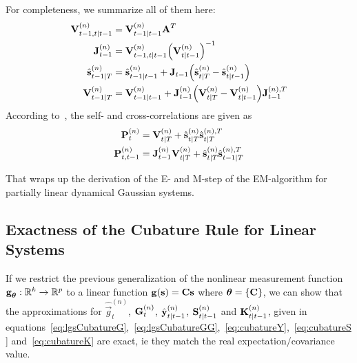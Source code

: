 		For completeness, we summarize all of them here:
		\begin{align}
			\boldsymbol{\mathrm{V}}_{t - 1, t \vert t - 1}^{(n)} &= \boldsymbol{\mathrm{V}}_{t - 1 \vert t - 1}^{(n)} \boldsymbol{\mathrm{A}}^T  \nonumber \\
			\boldsymbol{\mathrm{J}}_{t - 1}^{(n)} &= \boldsymbol{\mathrm{V}}_{t - 1, t \vert t - 1}^{(n)} \Big(\boldsymbol{\mathrm{V}}_{t \vert t - 1}^{(n)}\Big)^{-1}  \nonumber \\
			\hat{\boldsymbol{\mathrm{s}}}_{t - 1 \vert T}^{(n)} &= \hat{\boldsymbol{\mathrm{s}}}_{t - 1 \vert t - 1}^{(n)} + \boldsymbol{\mathrm{J}}_{t - 1} \Big(\hat{\boldsymbol{\mathrm{s}}}_{t \vert T}^{(n)} - \hat{\boldsymbol{\mathrm{s}}}_{t \vert t - 1}^{(n)}\Big)  \label{eq:posteriorMean} \\
			\boldsymbol{\mathrm{V}}_{t - 1 \vert T}^{(n)} &= \boldsymbol{\mathrm{V}}_{t - 1 \vert t - 1}^{(n)} + \boldsymbol{\mathrm{J}}_{t - 1}^{(n)} \Big(\boldsymbol{\mathrm{V}}_{t \vert T}^{(n)} - \boldsymbol{\mathrm{V}}_{t \vert t - 1}^{(n)}\Big) \boldsymbol{\mathrm{J}}_{t - 1}^{(n), T}  \label{eq:posteriorCov}
		\end{align}
		According to~\cite{minkaBayesianLinearRegression1999}, the self- and cross-correlations are given as
		\begin{align*}
			\boldsymbol{\mathrm{P}}_t^{(n)} &= \boldsymbol{\mathrm{V}}_{t \vert T}^{(n)} + \hat{\boldsymbol{\mathrm{s}}}_{t \vert T}^{(n)} \hat{\boldsymbol{\mathrm{s}}}_{t \vert T}^{(n), T} \\
			\boldsymbol{\mathrm{P}}_{t, t - 1}^{(n)} &= \boldsymbol{\mathrm{J}}_{t - 1}^{(n)} \boldsymbol{\mathrm{V}}_{t \vert T}^{(n)} + \hat{\boldsymbol{\mathrm{s}}}_{t \vert T}^{(n)} \hat{\boldsymbol{\mathrm{s}}}_{t - 1 \vert T}^{(n), T}
		\end{align*}

		That wraps up the derivation of the E- and M-step of the EM-algorithm for partially linear dynamical Gaussian systems.

	\subsection{Exactness of the Cubature Rule for Linear Systems}
		If we restrict the previous generalization of the nonlinear measurement function \( \boldsymbol{\mathrm{g}}_{\boldsymbol{\mathrm{\theta}}} : \mathbb{R}^k \to \mathbb{R}^p \) to a linear function \( \boldsymbol{\mathrm{g}}(\boldsymbol{\mathrm{s}}) = \boldsymbol{\mathrm{C}} \boldsymbol{\mathrm{s}} \) where \( \boldsymbol{\mathrm{\theta}} = \{ \boldsymbol{\mathrm{C}} \} \), we can show that the approximations for \( \hat{\vec{g}}_t^{(n)} \), \( \boldsymbol{\mathrm{G}}_t^{(n)} \), \( \hat{\boldsymbol{\mathrm{y}}}_{t \vert t - 1}^{(n)} \), \( \boldsymbol{\mathrm{S}}_{t \vert t - 1}^{(n)} \) and \( \boldsymbol{\mathrm{K}}_{t \vert t - 1}^{(n)} \), given in equations~\eqref{eq:lgsCubatureG},~\eqref{eq:lgsCubatureGG},~\eqref{eq:cubatureY},~\eqref{eq:cubatureS} and~\eqref{eq:cubatureK} are exact, \ac{ie} they match the real expectation/covariance value.

